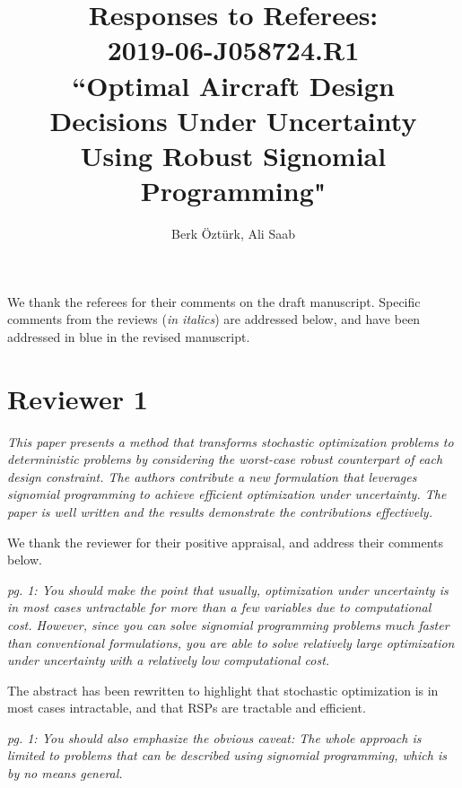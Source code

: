 \documentclass[11pt]{article}
\begin{document}
    \title{Responses to Referees: \\
    2019-06-J058724.R1 \\
    ``Optimal Aircraft Design \\ Decisions Under Uncertainty \\
    Using Robust Signomial Programming"}

    \author{Berk \"Ozt\"urk, Ali Saab}

    \maketitle

    We thank the referees for their comments on the draft manuscript.
    Specific comments from the reviews (\textit{in italics}) are addressed below, and
    have been addressed {\color{blue} in blue} in the revised manuscript.

    \section{Reviewer 1}

    \textit{This paper presents a method that transforms stochastic optimization problems to
    deterministic problems by considering the worst-case robust counterpart of each design constraint.
    The authors contribute a new formulation that leverages signomial programming to achieve
    efficient optimization under uncertainty. The paper is well written and the results
    demonstrate the contributions effectively.}

    We thank the reviewer for their positive appraisal, and address their comments below.
    \bigskip

    \textit{pg. 1: You should make the point that usually, optimization under uncertainty is
    in most cases untractable for more than a few variables due to computational cost.
    However, since you can solve signomial programming problems much faster than conventional formulations,
    you are able to solve relatively large optimization under uncertainty with a relatively low computational cost.}

    The abstract has been rewritten to highlight that stochastic optimization is in most cases
    intractable, and that RSPs are tractable and efficient.
    \bigskip

    \textit{pg. 1: You should also emphasize the obvious caveat: The whole approach
    is limited to problems that can be described using signomial programming, which is by no means general.}
\end{document}
